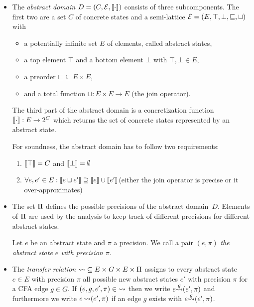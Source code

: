 \begin{itemize}
 \item The \emph{abstract domain} $D = (C, \mathcal{E}, \left\llbracket \cdot \right\rrbracket)$ consists of three subcomponents. The first two are a set $C$ of concrete states and a semi-lattice $\mathcal{E} = (E, \top, \bot, \sqsubseteq, \sqcup)$ with
 \begin{itemize}
   \item a potentially infinite set $E$ of elements, called abstract states,
   \item a top element $\top$ and a bottom element $\bot$ with $\top, \bot \in E$,
   \item a preorder $\mathord{\sqsubseteq} \subseteq E \times E$,
   \item and a total function $\sqcup : E \times E \rightarrow E$ (the join operator).
 \end{itemize}
  The third part of the abstract domain is a concretization function $\left\llbracket \cdot \right\rrbracket : E \rightarrow 2^C$ which returns the set of concrete states represented by an abstract state.

 For soundness, the abstract domain has to follow two requirements:
  \begin{enumerate}
   \item $\left\llbracket \top \right\rrbracket = C$ and $\left\llbracket \bot \right\rrbracket = \emptyset$
   \item $\forall e, e' \in E: \left\llbracket e \sqcup e' \right\rrbracket \supseteq \left\llbracket e \right\rrbracket \cup \left\llbracket e' \right\rrbracket$\newline (either the join operator is precise or it over-approximates)
  \end{enumerate}

 \item The set $\Pi$ defines the possible precisions of the abstract domain~$D$.
 Elements of $\Pi$ are used by the analysis to keep track of different precisions for different abstract states.
 
 Let $e$ be an abstract state and $\pi$ a precision. We call a pair $(e, \pi)$ \emph{the abstract state $e$ with precision $\pi$}.

 \item The \emph{transfer relation} $\operatorname{\leadsto} \subseteq E \times G \times E \times \Pi$ assigns to every abstract state $e \in E$ with precision $\pi$ all possible new abstract states $e'$ with precision $\pi$  for a \ac{CFA} edge $g \in G$. If $(e,g,e', \pi) \in \operatorname{\leadsto}$ then we write $e \overset{g}{\operatorname{\leadsto}} (e', \pi)$ and furthermore we write $e \operatorname{\leadsto} (e', \pi)$ if an edge $g$ exists with $e \overset{g}{\operatorname{\leadsto}} (e', \pi)$.
 

\end{itemize}
